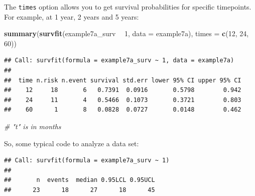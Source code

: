 \documentclass[]{book}
\newenvironment{Shaded}{\begin{snugshade}}{\end{snugshade}}
\newcommand{\CommentTok}[1]{\textcolor[rgb]{0.56,0.35,0.01}{\textit{#1}}}
\newcommand{\DataTypeTok}[1]{\textcolor[rgb]{0.13,0.29,0.53}{#1}}
\newcommand{\DecValTok}[1]{\textcolor[rgb]{0.00,0.00,0.81}{#1}}
\newcommand{\KeywordTok}[1]{\textcolor[rgb]{0.13,0.29,0.53}{\textbf{#1}}}
\newcommand{\NormalTok}[1]{#1}
\newcommand{\OperatorTok}[1]{\textcolor[rgb]{0.81,0.36,0.00}{\textbf{#1}}}
\newcommand{\StringTok}[1]{\textcolor[rgb]{0.31,0.60,0.02}{#1}}
\begin{document}
The \texttt{times} option allows you to get survival probabilities for
specific timepoints. For example, at 1 year, 2 years and 5 years:

\begin{Shaded}
\begin{Highlighting}[]
\KeywordTok{summary}\NormalTok{(}\KeywordTok{survfit}\NormalTok{(example7a_surv }\OperatorTok{~}\StringTok{ }\DecValTok{1}\NormalTok{, }\DataTypeTok{data =}\NormalTok{ example7a), }\DataTypeTok{times =} \KeywordTok{c}\NormalTok{(}\DecValTok{12}\NormalTok{, }\DecValTok{24}\NormalTok{, }\DecValTok{60}\NormalTok{))}
\end{Highlighting}
\end{Shaded}

\begin{verbatim}
## Call: survfit(formula = example7a_surv ~ 1, data = example7a)
## 
##  time n.risk n.event survival std.err lower 95% CI upper 95% CI
##    12     18       6   0.7391  0.0916       0.5798        0.942
##    24     11       4   0.5466  0.1073       0.3721        0.803
##    60      1       8   0.0828  0.0727       0.0148        0.462
\end{verbatim}

\begin{Shaded}
\begin{Highlighting}[]
\CommentTok{# "t" is in months}
\end{Highlighting}
\end{Shaded}

So, some typical code to analyze a data set:

\begin{Shaded}
\end{Shaded}

\begin{verbatim}
## Call: survfit(formula = example7a_surv ~ 1)
## 
##       n  events  median 0.95LCL 0.95UCL 
##      23      18      27      18      45
\end{verbatim}
\end{document}
